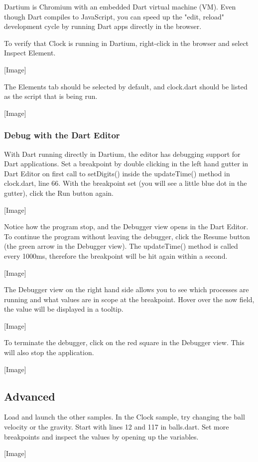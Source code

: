 Dartium is Chromium with an embedded Dart virtual machine (VM). Even though Dart compiles to JavaScript, you can speed up the "edit, reload" development cycle by running Dart apps directly in the browser.

To verify that Clock is running in Dartium, right-click in the browser and select Inspect Element.

[Image]

The Elements tab should be selected by default, and clock.dart should be listed as the script that is being run.

[Image]

\subsubsection{Debug with the Dart Editor}

With Dart running directly in Dartium, the editor has debugging support for Dart applications. Set a breakpoint by double clicking in the left hand gutter in Dart Editor on first call to setDigits() inside the updateTime() method in clock.dart, line 66. With the breakpoint set (you will see a little blue dot in the gutter), click the Run button again.

[Image]

Notice how the program stop, and the Debugger view opens in the Dart Editor. To continue the program without leaving the debugger, click the Resume button (the green arrow in the Debugger view). The updateTime() method is called every 1000ms, therefore the breakpoint will be hit again within a second.

[Image]

The Debugger view on the right hand side allows you to see which processes are running and what values are in scope at the breakpoint. Hover over the now field, the value will be displayed in a tooltip.

[Image]

To terminate the debugger, click on the red square in the Debugger view. This will also stop the application.

[Image]

\subsection{Advanced}

Load and launch the other samples.
In the Clock sample, try changing the ball velocity or the gravity. Start with lines 12 and 117 in balls.dart.
Set more breakpoints and inspect the values by opening up the variables.

[Image]
